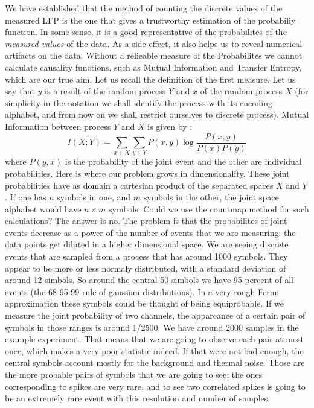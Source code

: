 \documentclass[10pt]{article}
\begin{document}
We have established that the method of counting the discrete values of
the measured LFP is the one that gives a trustworthy estimation of the
probabiliy function. In some sense, it is a good representative
of the probabilites of the \emph{measured values} of the data.
As a side effect, it also helps us to reveal numerical artifacts
on the data. Without a relieable measure of the Probabilites
we cannot  calculate causality functions, such as Mutual Information and
Transfer Entropy, which are our true aim.
Let us recall the definition of the first measure. Let us say that
$y$ is a result of the random process $Y$ and $x$ of the random
process $X$ (for simplicity in the notation we shall identify
the process with its encoding alphabet, and from now on we shall
restrict ourselves to discrete process). Mutual Information
between process $Y$ and $X$ is given by \cite{Cover1991}:
\begin{equation}
  I(X;Y)=\sum_{x \in X} \sum_{y \in Y} P(x,y) \log \frac{P(x,y)}{P(x)P(y)}
\end{equation}
where $P(y,x)$ is the probability of the joint event and the other are
individual probabilities. Here is where our problem grows in dimensionality.
These joint probabilities have as domain a cartesian product of the
separated spaces $X$ and $Y$. If one has $n$ symbols in one, and
$m$ symbols in the other, the joint space alphabet would have $ n \times m$ 
symbols.
Could we use the countmap method for such calculations?
The answer is no. The problem is that the probabilites of joint events
decrease as a power of the number of events that we are measuring: the data
points get diluted in a higher dimensional space. We are seeing
discrete events that are sampled from a process that has around 1000 symbols.
They appear to be more or less normaly distributed, with a standard deviation
of around 12 simbols. So around the central 50 simbols we have 95 percent of all
events (the 68-95-99 rule of gaussian distributions).
In a very rough Fermi approximation these symbols could be thought of being
equiprobable. If we measure the joint probability of two channels,
the appareance of a certain pair
of symbols in those ranges is around 1/2500. We have around 2000 samples in
the example experiment. That means that we are going to observe each pair
at most once, which makes a very poor statistic indeed.
If that were not bad enough,
the central symbols account mostly for the background and thermal noise.
Those are the more probable pairs of symbols that we are going to see: the
ones corresponding to spikes are very rare, and to see
two correlated spikes is going to be an extremely rare event with this
resulution and number of samples.
\end{document}
